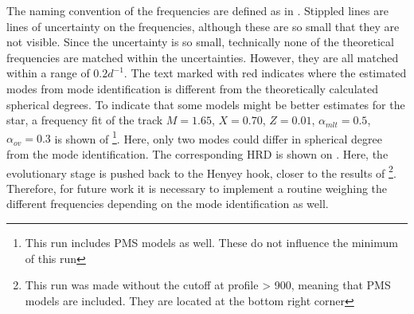   The naming convention of the frequencies are defined as in . Stippled lines are lines of uncertainty on the frequencies, although these are so small that they are not visible. Since the uncertainty is so small, technically none of the theoretical frequencies are matched within the uncertainties. However, they are all matched within a range of $0.2 d^{-1}$. The text marked with red indicates where the estimated modes from mode identification is different from the theoretically calculated spherical degrees. To indicate that some models might be better estimates for the star, a frequency fit of the track $M=1.65$, $X=0.70$, $Z=0.01$, $\alpha_{mlt} = 0.5$, $\alpha_{ov}=0.3$ is shown of \footnote{This run includes PMS models as well. These do not influence the minimum \chis of this run}. Here, only two modes could differ in spherical degree from the mode identification. The corresponding HRD is shown on . Here, the evolutionary stage is pushed back to the Henyey hook, closer to the results of \citet{lenz2010delta}\footnote{This run was made without the cutoff at profile > 900, meaning that PMS models are included. They are located at the bottom right corner}. Therefore, for future work it is necessary to implement a routine weighing the different frequencies depending on the mode identification as well. 
 
